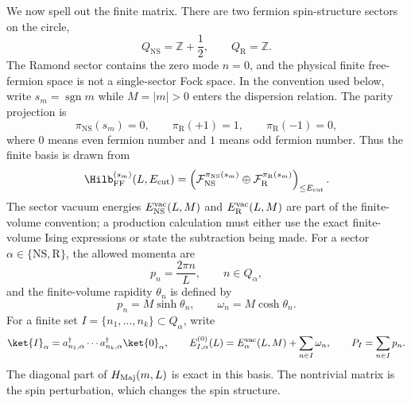 We now spell out the finite matrix.  There are two fermion spin-structure
sectors on the circle,
\[
  Q_{\mathrm{NS}}=\mathbb Z+\frac12,\qquad
  Q_{\mathrm R}=\mathbb Z .
\]
The Ramond sector contains the zero mode \(n=0\), and the physical finite
free-fermion space is not a single-sector Fock space.  In the convention used
below, write \(s_m=\operatorname{sgn}m\) while \(M=|m|>0\) enters the
dispersion relation.  The parity projection is
\begin{equation}
  \pi_{\mathrm{NS}}(s_m)=0,\qquad
  \pi_{\mathrm R}(+1)=1,\qquad
  \pi_{\mathrm R}(-1)=0,
  \label{eq:ising-tffsa-sector-parity-convention}
\end{equation}
where \(0\) means even fermion number and \(1\) means odd fermion number.  Thus
the finite basis is drawn from
\begin{equation}
  \Hilb_{\rm FF}^{(s_m)}(L,E_{\rm cut})
  =
  \left(
    \mathcal F_{\mathrm{NS}}^{\pi_{\mathrm{NS}}(s_m)}
    \oplus
    \mathcal F_{\mathrm R}^{\pi_{\mathrm R}(s_m)}
  \right)_{\le E_{\rm cut}} .
  \label{eq:ising-tffsa-ns-r-finite-space}
\end{equation}
The sector vacuum energies
\(E_{\mathrm{NS}}^{\rm vac}(L,M)\) and
\(E_{\mathrm R}^{\rm vac}(L,M)\) are part of the finite-volume convention; a
production calculation must either use the exact finite-volume Ising
expressions or state the subtraction being made.  For a sector
\(\alpha\in\{\mathrm{NS},\mathrm R\}\), the allowed momenta are
\[
  p_n=\frac{2\pi n}{L},\qquad n\in Q_\alpha,
\]
and the finite-volume rapidity \(\theta_n\) is defined by
\[
  p_n=M\sinh\theta_n,\qquad
  \omega_n=M\cosh\theta_n .
\]
For a finite set \(I=\{n_1,\ldots,n_k\}\subset Q_\alpha\), write
\[
  \ket{I}_{\alpha}
  =
  a_{n_1,\alpha}^\dagger\cdots a_{n_k,\alpha}^\dagger
  \ket{0}_{\alpha},
  \qquad
  E_{I,\alpha}^{(0)}(L)=E_{\alpha}^{\rm vac}(L,M)+\sum_{n\in I}\omega_n,
  \qquad
  P_I=\sum_{n\in I}p_n .
\]
The diagonal part of \(H_{\rm Maj}(m,L)\) is exact in this basis.  The
nontrivial matrix is the spin perturbation, which changes the spin structure.

